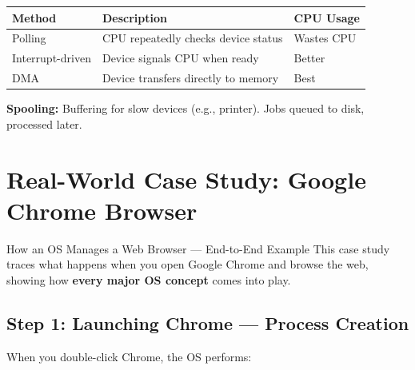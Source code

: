 \documentclass[12pt,a4paper]{article}
\begin{document}
\begin{center}
\begin{tabular}{@{} l p{6cm} l @{}}
\toprule
\textbf{Method} & \textbf{Description} & \textbf{CPU Usage} \\
\midrule
Polling & CPU repeatedly checks device status & Wastes CPU \\
Interrupt-driven & Device signals CPU when ready & Better \\
DMA & Device transfers directly to memory & Best \\
\bottomrule
\end{tabular}
\end{center}

\textbf{Spooling:} Buffering for slow devices (e.g., printer). Jobs queued to disk, processed later.

\newpage
\section{Real-World Case Study: Google Chrome Browser}

\begin{conceptbox}{How an OS Manages a Web Browser --- End-to-End Example}
This case study traces what happens when you open Google Chrome and browse the web, showing how \textbf{every major OS concept} comes into play.
\end{conceptbox}

\subsection{Step 1: Launching Chrome --- Process Creation}

When you double-click Chrome, the OS performs:
\end{document}
